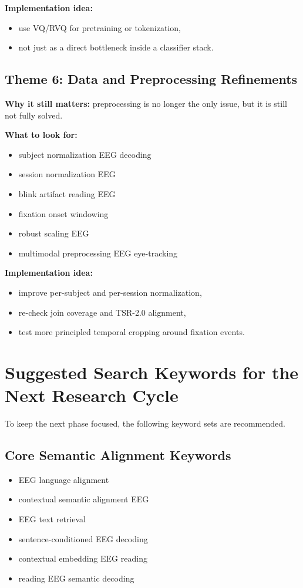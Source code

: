 \documentclass[11pt]{article}
\begin{document}
\textbf{Implementation idea:}
\begin{itemize}
    \item use VQ/RVQ for pretraining or tokenization,
    \item not just as a direct bottleneck inside a classifier stack.
\end{itemize}

\subsection{Theme 6: Data and Preprocessing Refinements}

\textbf{Why it still matters:} preprocessing is no longer the only issue, but it is still not fully solved.

\textbf{What to look for:}
\begin{itemize}
    \item subject normalization EEG decoding
    \item session normalization EEG
    \item blink artifact reading EEG
    \item fixation onset windowing
    \item robust scaling EEG
    \item multimodal preprocessing EEG eye-tracking
\end{itemize}

\textbf{Implementation idea:}
\begin{itemize}
    \item improve per-subject and per-session normalization,
    \item re-check join coverage and TSR-2.0 alignment,
    \item test more principled temporal cropping around fixation events.
\end{itemize}

\section{Suggested Search Keywords for the Next Research Cycle}

To keep the next phase focused, the following keyword sets are recommended.

\subsection{Core Semantic Alignment Keywords}

\begin{itemize}
    \item EEG language alignment
    \item contextual semantic alignment EEG
    \item EEG text retrieval
    \item sentence-conditioned EEG decoding
    \item contextual embedding EEG reading
    \item reading EEG semantic decoding
\end{itemize}
\end{document}
